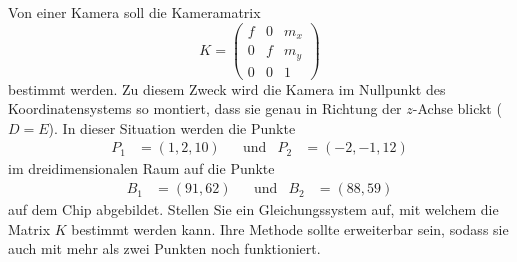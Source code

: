 Von einer Kamera soll die Kameramatrix
\[
K=\begin{pmatrix}
f&0&m_x\\
0&f&m_y\\
0&0&1
\end{pmatrix}
\]
bestimmt werden.
Zu diesem Zweck wird die Kamera im Nullpunkt des Koordinatensystems
so montiert, dass sie genau in Richtung der $z$-Achse blickt ($D=E$).
In dieser Situation werden die Punkte
\[
\begin{aligned}
P_1&=(1,2,10)
&&\text{und}&
P_2&=(-2,-1,12)
\end{aligned}
\]
im dreidimensionalen Raum auf die Punkte
\[
\begin{aligned}
B_1&=(91,62)
&&\text{und}&
B_2&=(88,59)
\end{aligned}
\]
auf dem Chip abgebildet.
Stellen Sie ein Gleichungssystem auf, mit welchem die Matrix $K$ 
bestimmt werden kann.
Ihre Methode sollte erweiterbar sein, sodass sie auch mit mehr als 
zwei Punkten noch funktioniert.


